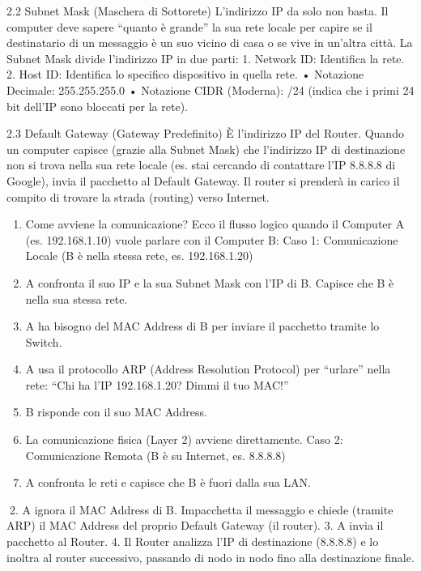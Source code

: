 \documentclass[11pt,a4paper]{article}
\providecommand{\tightlist}{%
  \setlength{\itemsep}{0pt}\setlength{\parskip}{0pt}}
\begin{document}
2.2 Subnet Mask (Maschera di Sottorete) L'indirizzo IP da solo non
basta. Il computer deve sapere ``quanto è grande'' la sua rete locale
per capire se il destinatario di un messaggio è un suo vicino di casa o
se vive in un'altra città. La Subnet Mask divide l'indirizzo IP in due
parti: 1. Network ID: Identifica la rete. 2. Host ID: Identifica lo
specifico dispositivo in quella rete. • Notazione Decimale:
255.255.255.0 • Notazione CIDR (Moderna): /24 (indica che i primi 24 bit
dell'IP sono bloccati per la rete).

2.3 Default Gateway (Gateway Predefinito) È l'indirizzo IP del Router.
Quando un computer capisce (grazie alla Subnet Mask) che l'indirizzo IP
di destinazione non si trova nella sua rete locale (es. stai cercando di
contattare l'IP 8.8.8.8 di Google), invia il pacchetto al Default
Gateway. Il router si prenderà in carico il compito di trovare la strada
(routing) verso Internet.

\begin{enumerate}
\def\labelenumi{\arabic{enumi}.}
\setcounter{enumi}{2}
\tightlist
\item
  Come avviene la comunicazione? Ecco il flusso logico quando il
  Computer A (es. 192.168.1.10) vuole parlare con il Computer B: Caso 1:
  Comunicazione Locale (B è nella stessa rete, es. 192.168.1.20)
\item
  A confronta il suo IP e la sua Subnet Mask con l'IP di B. Capisce che
  B è nella sua stessa rete.
\item
  A ha bisogno del MAC Address di B per inviare il pacchetto tramite lo
  Switch.
\item
  A usa il protocollo ARP (Address Resolution Protocol) per ``urlare''
  nella rete: ``Chi ha l'IP 192.168.1.20? Dimmi il tuo MAC!''
\item
  B risponde con il suo MAC Address.
\item
  La comunicazione fisica (Layer 2) avviene direttamente. Caso 2:
  Comunicazione Remota (B è su Internet, es. 8.8.8.8)
\item
  A confronta le reti e capisce che B è fuori dalla sua LAN.
\end{enumerate}

2. A ignora il MAC Address di B. Impacchetta il messaggio e chiede
(tramite ARP) il MAC Address del proprio Default Gateway (il router). 3.
A invia il pacchetto al Router. 4. Il Router analizza l'IP di
destinazione (8.8.8.8) e lo inoltra al router successivo, passando di
nodo in nodo fino alla destinazione finale.
\end{document}

